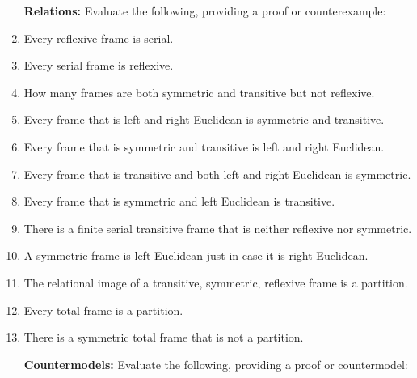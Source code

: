 \documentclass[a4paper, 11pt]{article} %
\begin{document}
\begin{enumerate}[leftmargin=1.2in,itemsep=1pt]\small
	\item[\bf Relations:] Evaluate the following, providing a proof or counterexample:
    \item Every reflexive frame is serial.
    \item Every serial frame is reflexive.
    \item How many frames are both symmetric and transitive but not reflexive.
    \item Every frame that is left and right Euclidean is symmetric and transitive.
    \item Every frame that is symmetric and transitive is left and right Euclidean.
    \item Every frame that is transitive and both left and right Euclidean is symmetric.
    \item Every frame that is symmetric and left Euclidean is transitive.
    \item There is a finite serial transitive frame that is neither reflexive nor symmetric.
    \item A symmetric frame is left Euclidean just in case it is right Euclidean.
    \item The relational image of a transitive, symmetric, reflexive frame is a partition.
    \item Every total frame is a partition.
    \item There is a symmetric total frame that is not a partition.
	\item[\bf Countermodels:] Evaluate the following, providing a proof or countermodel:
    \begin{enumerate}[label=\arabic*.,resume]\small
\end{enumerate}
\end{enumerate}
\end{document}
